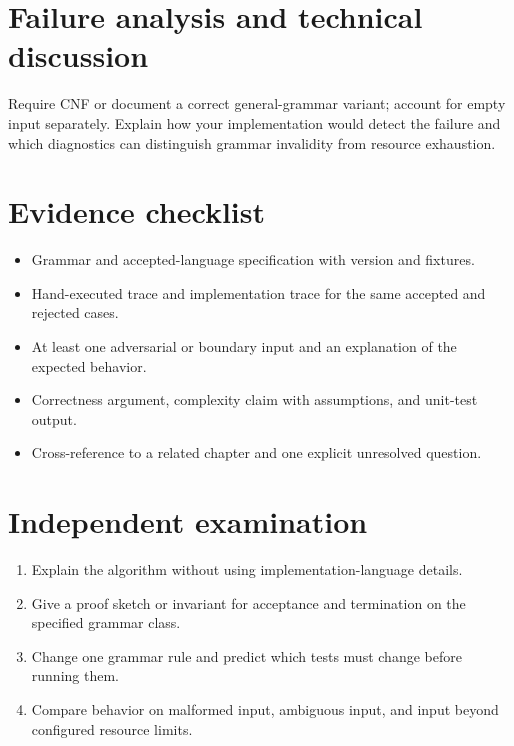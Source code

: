 \documentclass[11pt,letterpaper]{article}
\begin{document}
\section{Failure analysis and technical discussion}
Require CNF or document a correct general-grammar variant; account for empty input separately. Explain how your implementation would detect the failure and which diagnostics can distinguish grammar invalidity from resource exhaustion.
\section{Evidence checklist}
\begin{itemize}
\item Grammar and accepted-language specification with version and fixtures.
\item Hand-executed trace and implementation trace for the same accepted and rejected cases.
\item At least one adversarial or boundary input and an explanation of the expected behavior.
\item Correctness argument, complexity claim with assumptions, and unit-test output.
\item Cross-reference to a related chapter and one explicit unresolved question.
\end{itemize}
\section{Independent examination}
\begin{enumerate}
\item Explain the algorithm without using implementation-language details.
\item Give a proof sketch or invariant for acceptance and termination on the specified grammar class.
\item Change one grammar rule and predict which tests must change before running them.
\item Compare behavior on malformed input, ambiguous input, and input beyond configured resource limits.
\end{enumerate}
\end{document}
